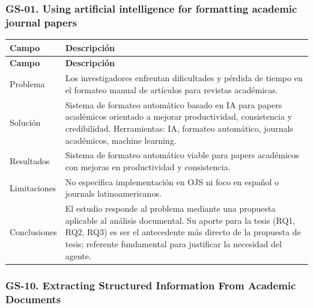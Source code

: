\subsubsection*{GS-01. Using artificial intelligence for formatting academic journal papers}

\begin{longtable}{@{}>{\raggedright\arraybackslash}p{}>{\raggedright\arraybackslash}p{}@{}}
\toprule
\textbf{Campo} & \textbf{Descripción} \\
\midrule
\endfirsthead
\toprule
\textbf{Campo} & \textbf{Descripción} \\
\midrule
\endhead
\bottomrule
\endfoot
\endlastfoot
Problema & Los investigadores enfrentan dificultades y pérdida de tiempo en el formateo manual de artículos para revistas académicas. \\
Solución & Sistema de formateo automático basado en IA para papers académicos orientado a mejorar productividad, consistencia y credibilidad. Herramientas: IA, formateo automático, journals académicos, machine learning. \\
Resultados & Sistema de formateo automático viable para papers académicos con mejoras en productividad y consistencia. \\
Limitaciones & No especifica implementación en OJS ni foco en español o journals latinoamericanos. \\
Conclusiones & El estudio responde al problema mediante una propuesta aplicable al análisis documental. Su aporte para la tesis (RQ1, RQ2, RQ3) es ser el antecedente más directo de la propuesta de tesis; referente fundamental para justificar la necesidad del agente. \\
\end{longtable}

\subsubsection*{GS-10. Extracting Structured Information From Academic Documents}

